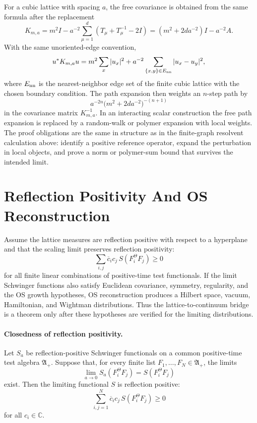 For a cubic lattice with spacing \(a\), the free covariance is obtained from
the same formula after the replacement
\begin{equation}
  K_{m,a}=m^2I-a^{-2}\sum_{\mu=1}^{d}(T_\mu+T_\mu^{-1}-2I)
  =
  (m^2+2da^{-2})I-a^{-2}A .
  \label{eq:massive-cubic-lattice-operator}
\end{equation}
With the same unoriented-edge convention,
\[
  u^*K_{m,a}u
  =
  m^2\sum_x |u_x|^2
  +
  a^{-2}\sum_{\{x,y\}\in E_{\rm nn}}|u_x-u_y|^2 ,
\]
where \(E_{\rm nn}\) is the nearest-neighbor edge set of the finite cubic
lattice with the chosen boundary condition.
The path expansion then weights an \(n\)-step path by
\[
  a^{-2n}\bigl(m^2+2da^{-2}\bigr)^{-(n+1)}
\]
in the covariance matrix \(K_{m,a}^{-1}\).  In an interacting scalar
construction the free path expansion is replaced by a random-walk or polymer
expansion with local weights.  The proof obligations are the same in
structure as in the finite-graph resolvent calculation above: identify a
positive reference operator, expand the perturbation in local objects, and
prove a norm or polymer-sum bound that survives the intended limit.

\section{Reflection Positivity And OS Reconstruction}

Assume the lattice measures are reflection positive with respect to a
hyperplane and that the scaling limit preserves reflection positivity:
\[
  \sum_{i,j}\overline c_i c_j\,S(F_i^\Theta F_j)\geq0
\]
for all finite linear combinations of positive-time test functionals.  If the
limit Schwinger functions also satisfy Euclidean covariance, symmetry,
regularity, and the OS growth hypotheses, OS reconstruction produces a
Hilbert space, vacuum, Hamiltonian, and Wightman distributions.  Thus the
lattice-to-continuum bridge is a theorem only after these hypotheses are
verified for the limiting distributions.

\paragraph{Closedness of reflection positivity.}
Let \(S_a\) be reflection-positive Schwinger functionals on a common
positive-time test algebra \(\mathfrak A_+\).  Suppose that, for every
finite list \(F_1,\ldots,F_N\in\mathfrak A_+\), the limits
\begin{equation}
  \lim_{a\to0} S_a(F_i^\Theta F_j)
  =
  S(F_i^\Theta F_j)
  \label{eq:reflection-positive-matrix-entry-limit}
\end{equation}
exist.  Then the limiting functional \(S\) is reflection positive:
\begin{equation}
  \sum_{i,j=1}^{N}\overline c_i c_j\,S(F_i^\Theta F_j)\geq0
  \label{eq:limit-reflection-positivity}
\end{equation}
for all \(c_i\in\mathbb C\).

